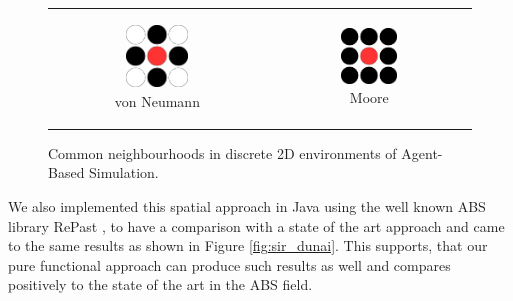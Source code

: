 \begin{figure}
\begin{center}
	\begin{tabular}{c c}
		\begin{subfigure}[b]{0.3\textwidth}
			\centering
			\includegraphics[width=0.5\textwidth, angle=0]{./fig/timedriven/neumann.png}
			\caption{von Neumann}
			\label{fig:neumann_neighbourhood}
		\end{subfigure}
    	&
		\begin{subfigure}[b]{0.3\textwidth}
			\centering
			\includegraphics[width=0.5\textwidth, angle=0]{./fig/timedriven/moore.png}
			\caption{Moore}
			\label{fig:moore_neighbourhood}
		\end{subfigure}
    \end{tabular}
	\caption{Common neighbourhoods in discrete 2D environments of Agent-Based Simulation.}
	\label{fig:abs_neighbourhoods}
\end{center}
\end{figure}

We also implemented this spatial approach in Java using the well known ABS library RePast \cite{north_complex_2013}, to have a comparison with a state of the art approach and came to the same results as shown in Figure \ref{fig:sir_dunai}. This supports, that our pure functional approach can produce such results as well and compares positively to the state of the art in the ABS field.

